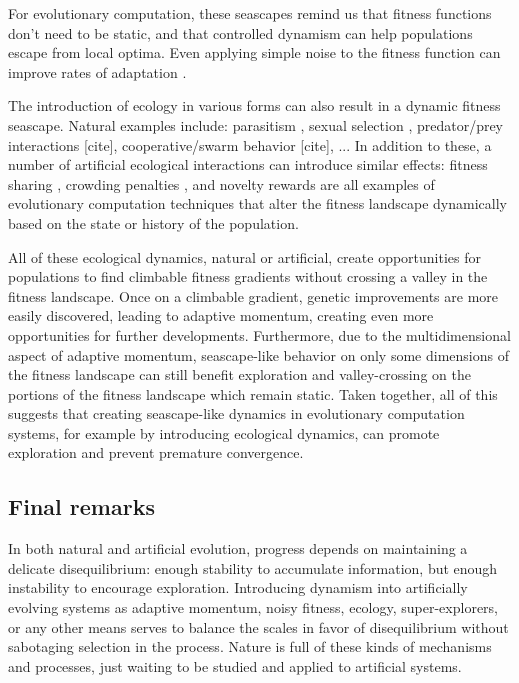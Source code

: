 For evolutionary computation, these seascapes remind us that fitness functions don't need to be static, and that controlled dynamism can help populations escape from local optima.
Even applying simple noise to the fitness function can improve rates of adaptation \citep{ragusa2021connections}.

The introduction of ecology in various forms can also result in a dynamic fitness seascape.
Natural examples include: parasitism \citep{johnson2025keep}, sexual selection \citep{bohm2019sexual}, predator/prey interactions [cite], cooperative/swarm behavior [cite], ...
In addition to these, a number of artificial ecological interactions can introduce similar effects: fitness sharing \citep{della2007niches}, crowding penalties \citep{deb2002fast}, and novelty rewards \citep{lehman2011novelty, mouret2015illuminating} are all examples of evolutionary computation techniques that alter the fitness landscape dynamically based on the state or history of the population.

All of these ecological dynamics, natural or artificial, create opportunities for populations to find climbable fitness gradients without crossing a valley in the fitness landscape.
Once on a climbable gradient, genetic improvements are more easily discovered, leading to adaptive momentum, creating even more opportunities for further developments.
Furthermore, due to the multidimensional aspect of adaptive momentum, seascape-like behavior on only some dimensions of the fitness landscape can still benefit exploration and valley-crossing on the portions of the fitness landscape which remain static.
Taken together, all of this suggests that creating seascape-like dynamics in evolutionary computation systems, for example by introducing ecological dynamics, can promote exploration and prevent premature convergence.

\subsection{Final remarks}
In both natural and artificial evolution, progress depends on maintaining a delicate disequilibrium: enough stability to accumulate information, but enough instability to encourage exploration.
Introducing dynamism into artificially evolving systems as adaptive momentum, noisy fitness, ecology, super-explorers, or any other means serves to balance the scales in favor of disequilibrium without sabotaging selection in the process.
Nature is full of these kinds of mechanisms and processes, just waiting to be studied and applied to artificial systems.
%

